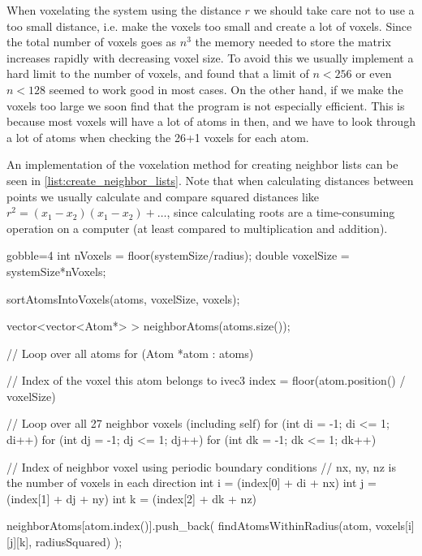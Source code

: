 When voxelating the system using the distance $r$ we should take care not to use a too small distance, i.e. make the voxels too small and create a lot of voxels. Since the total number of voxels goes as $n^3$ the memory needed to store the matrix increases rapidly with decreasing voxel size. To avoid this we usually implement a hard limit to the number of voxels, and found that a limit of $n < 256$ or even $n < 128$ seemed to work good in most cases. On the other hand, if we make the voxels too large we soon find that the program is not especially efficient. This is because most voxels will have a lot of atoms in then, and we have to look through a lot of atoms when checking the 26+1 voxels for each atom.

An implementation of the voxelation method for creating neighbor lists can be seen in \cref{list:create_neighbor_lists}. Note that when calculating distances between points we usually calculate and compare squared distances like $r^2 = (x_1-x_2)(x_1-x_2) + \dots$, since calculating roots are a time-consuming operation on a computer (at least compared to multiplication and addition).
%
%
\begin{listing}[!htb]%
\begin{cppcode*}{gobble=4}
    int nVoxels = floor(systemSize/radius);
    double voxelSize = systemSize*nVoxels;
    
    sortAtomsIntoVoxels(atoms, voxelSize, voxels);
    
    vector<vector<Atom*> > neighborAtoms(atoms.size());
    
    // Loop over all atoms
    for (Atom *atom : atoms) {
        // Index of the voxel this atom belongs to
        ivec3 index = floor(atom.position() / voxelSize)
        
        // Loop over all 27 neighbor voxels (including self)
        for (int di = -1; di <= 1; di++)
        for (int dj = -1; dj <= 1; dj++)
        for (int dk = -1; dk <= 1; dk++)
        {{{
            // Index of neighbor voxel using periodic boundary conditions
            // nx, ny, nz is the number of voxels in each direction
            int i = (index[0] + di + nx) %
            int j = (index[1] + dj + ny) %
            int k = (index[2] + dk + nz) %
            
            neighborAtoms[atom.index()].push_back(
                findAtomsWithinRadius(atom, voxels[i][j][k], radiusSquared)
            );
        }}}
    }
\end{cppcode*}
\caption{%
    An example of how to find the neighbor atoms within a given distance () of all atoms. This example assumes a cubic system of size . See \cref{list:sortAtomsIntoVoxels,list:findAtomsWithinRadius} for example implentations of  and . %
    \label{list:create_neighbor_lists}%
}%
\end{listing}%
